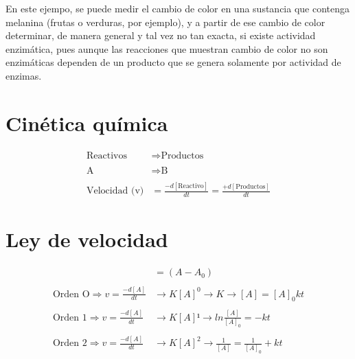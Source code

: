 En este ejempo, se puede medir el cambio de color en una sustancia que contenga melanina (frutas o verduras, por ejemplo), y a partir de ese cambio de color determinar, de manera general y tal vez no tan exacta, si existe actividad enzimática, pues aunque las reacciones que muestran cambio de color no son enzimáticas dependen de un producto que se genera solamente por actividad de enzimas.

\section{Cinética química}


\begin{align}
    \text{Reactivos} &\Longrightarrow \text{Productos} 
    \\
    \\
    \text{A} &\Longrightarrow \text{B}
    \\
    \\
    \text{Velocidad (v)} &= \frac{-d[\text{Reactivo}]}{dt}=\frac{+d[\text{Productos}]}{dt}
\end{align}


\section{Ley de velocidad}


\begin{align}
    [A] &= (A-A_0)
    \\
    \\
    \text{Orden O} \Longrightarrow v = \frac{-d[A]}{dt} &\rightarrow K[A]^0 \rightarrow K \rightarrow [A] = [A]_0kt
    \\
    \\
    \text{Orden 1} \Longrightarrow v = \frac{-d[A]}{dt} &\rightarrow K[A]¹
    \rightarrow ln \frac{[A]}{[A]_0} = -kt
    \\
    \\
    \text{Orden 2} \Longrightarrow v = \frac{-d[A]}{dt} &\rightarrow K[A]^2 \rightarrow \frac{1}{[A]} = \frac{1}{[A]_0} + kt
\end{align}

